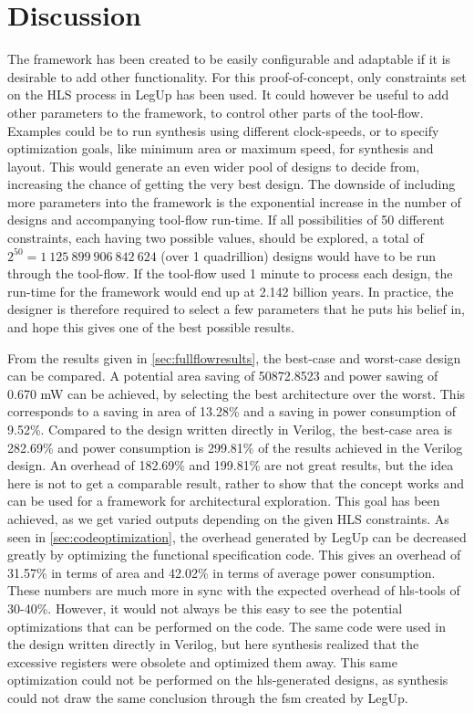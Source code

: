 \chapter{\label{chp:discussion}Discussion}

The framework has been created to be easily configurable and adaptable if it is desirable to add other functionality. For this proof-of-concept, only constraints set on the HLS process in LegUp has been used. It could however be useful to add other parameters to the framework, to control other parts of the tool-flow. Examples could be to run synthesis using different clock-speeds, or to specify optimization goals, like minimum area or maximum speed, for synthesis and layout. This would generate an even wider pool of designs to decide from, increasing the chance of getting the very best design. The downside of including more parameters into the framework is the exponential increase in the number of designs and accompanying tool-flow run-time. If all possibilities of 50 different constraints, each having two possible values, should be explored, a total of $2^{50} = 1~125~899~906~842~624$ (over 1 quadrillion) designs would have to be run through the tool-flow. If the tool-flow used 1 minute to process each design, the run-time for the framework would end up at 2.142 billion years. In practice, the designer is therefore required to select a few parameters that he puts his belief in, and hope this gives one of the best possible results.

From the results given in \cref{sec:fullflowresults}, the best-case and worst-case design can be compared. A potential area saving of 50872.8523 and power sawing of 0.670 mW can be achieved, by selecting the best architecture over the worst. This corresponds to a saving in area of 13.28\% and a saving in power consumption of 9.52\%. Compared to the design written directly in Verilog, the best-case area is 282.69\% and power consumption is 299.81\% of the results achieved in the Verilog design. An overhead of 182.69\% and 199.81\% are not great results, but the idea here is not to get a comparable result, rather to show that the concept works and can be used for a framework for architectural exploration. This goal has been achieved, as we get varied outputs depending on the given HLS constraints. As seen in \cref{sec:codeoptimization}, the overhead generated by LegUp can be decreased greatly by optimizing the functional specification code. This gives an overhead of 31.57\% in terms of area and 42.02\% in terms of average power consumption. These numbers are much more in sync with the expected overhead of \gls{hls}-tools of 30-40\%. However, it would not always be this easy to see the potential optimizations that can be performed on the code. The same code were used in the design written directly in Verilog, but here synthesis realized that the excessive registers were obsolete and optimized them away. This same optimization could not be performed on the \gls{hls}-generated designs, as synthesis could not draw the same conclusion through the \gls{fsm} created by LegUp.

